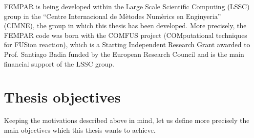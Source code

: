 FEMPAR is being developed within the Large Scale Scientific Computing (LSSC) group in the ``Centre Internacional de Mètodes Numèrics en Enginyeria'' (CIMNE), the group in which this thesis has been developed. More precisely, the FEMPAR code was born with the COMFUS project (COMputational techniques for FUSion reaction), which is a Starting Independent Research Grant awarded to Prof. Santiago Badia funded by the European Research Council and is the main financial support of the LSSC group.
 

\section{Thesis objectives}
\label{sec-C1_objectives}

Keeping the motivations described above in mind, let us define more precisely the main objectives which this thesis wants to achieve.

